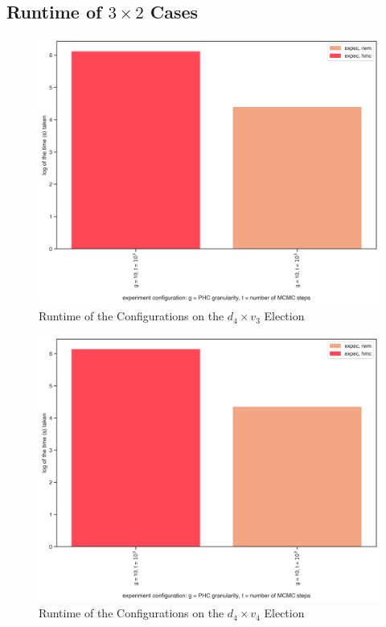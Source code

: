 \FloatBarrier
\subsection{Runtime of $3 \times 2$ Cases}

\begin{figure}[ht]\centering
 \includegraphics[width=0.75\linewidth]{figures/4_3_time.png}
 \caption{Runtime of the Configurations on the $d_4 \times v_3$ Election}
 \label{fig:4_3_time}
\end{figure}

\begin{figure}[ht]\centering
 \includegraphics[width=0.75\linewidth]{figures/4_4_time.png}
 \caption{Runtime of the Configurations on the $d_4 \times v_4$ Election}
 \label{fig:4_4_time_append}
\end{figure}

